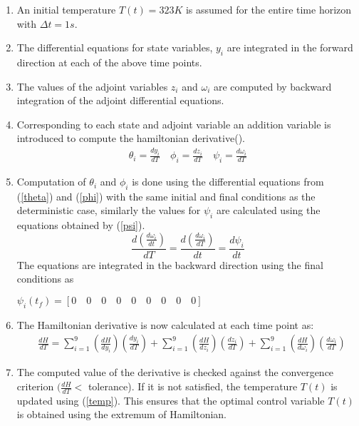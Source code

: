 \documentclass[3p,times,authoryear]{elsarticle}
\begin{document}
\begin{enumerate}
\item An initial temperature $T(t) = 323 K$ is assumed for the entire time horizon with $\Delta t = 1s$.
\item The differential equations for state variables, $y_{i}$ are integrated in the forward direction at each of the above time points.
\item The values of the adjoint variables $z_{i}$ and $\omega_{i}$ are computed by backward integration of the adjoint differential equations. 
\item Corresponding to each state and adjoint variable an addition variable is introduced to compute the hamiltonian derivative(\cite{benavides}).
\begin{align}
\theta_{i} = \frac{dy_{i}}{dT} \quad \phi_{i} = \frac{dz_{i}}{dT} \quad \psi_{i} = \frac{d\omega_{i}}{dT} \label{thetafipsi} 
\end{align}
\item Computation of $\theta_{i}$ and $\phi_{i}$ is done using the differential equations from (\ref{theta}) and (\ref{phi}) with the same initial and final conditions as the deterministic case, similarly the values for $\psi_{i}$ are calculated using the equations obtained by (\ref{psi}).
\begin{equation}
\frac{d\left( \frac{d\omega_{i}}{dt}  \right)}{dT} = \frac{d\left( \frac{d\omega_{i}}{dT}  \right)}{dt} = \frac{d\psi_{i}}{dt} \label{psi} 
\end{equation}
The equations are integrated in the backward direction using the final conditions as 
\begin{center}
 $\psi_{i}(t_{f}) = \left[  0 \quad 0 \quad 0 \quad 0 \quad 0 \quad 0 \quad 0 \quad 0 \quad 0 \right]$ 
\end{center} 
\item The Hamiltonian derivative is now calculated at each time point as:
\begin{align}
&\frac{dH}{dT} = \sum_{i=1}^{9} \left( \frac{dH}{dy_{i}}\right)\left(	\frac{dy_{i}}{dT} \right) + \sum_{i=1}^{9} \left(\frac{dH}{dz_{i}}\right)\left(\frac{dz_{i}}{dT} \right) + \sum_{i=1}^{9} \left(\frac{dH}{d\omega_{i}}\right)\left(\frac{d\omega_{i}}{dT} \right)
\end{align}
\item The computed value of the derivative is checked against the convergence criterion $(\frac{dH}{dT}<$ tolerance). If it is not satisfied, the temperature $T(t)$ is updated using (\ref{temp}). This ensures that the optimal control variable $T(t)$ is obtained using the extremum of Hamiltonian. 

\end{enumerate}
\end{document}
